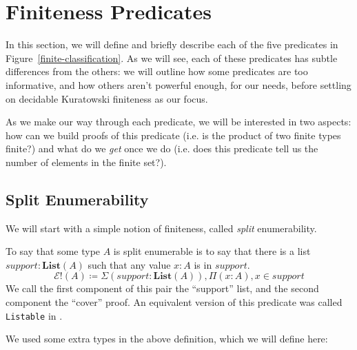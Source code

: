 \section{Finiteness Predicates} \label{finiteness-predicates}
In this section, we will define and briefly describe each of the five predicates
in Figure~\ref{finite-classification}.
As we will see, each of these predicates has subtle differences from the others:
we will outline how some predicates are too informative, and how others aren't
powerful enough, for our needs, before settling on decidable Kuratowski
finiteness as our focus.

As we make our way through each predicate, we will be interested in two aspects:
how can we build proofs of this predicate (i.e. is the product of two finite
types finite?) and what do we \emph{get} once we do (i.e. does this predicate
tell us the number of elements in the finite set?).
\subsection{Split Enumerability}
We will start with a simple notion of finiteness, called \emph{split}
enumerability.

\begin{definition} \label{split-enum-def}
  To say that some type \(A\) is split enumerable is to say that there is a list
  \(\mathit{support} : \mathbf{List}(A)\) such that any value \(x : A\) is in
  \(\mathit{support}\).
  \begin{equation} \label{split-enum-def-eqn}
    \mathcal{E}!(A) \coloneqq \Sigma {(\mathit{support} : \textbf{List}(A))} , \Pi {(x : A)} , x \in \mathit{support}
  \end{equation}
  We call the first component of this pair the ``support'' list, and the second
  component the ``cover'' proof.
  An equivalent version of this predicate was called \verb+Listable+ in
  \cite{firsovDependentlyTypedProgramming2015}.
\end{definition}
We used some extra types in the above definition, which we will define here:

